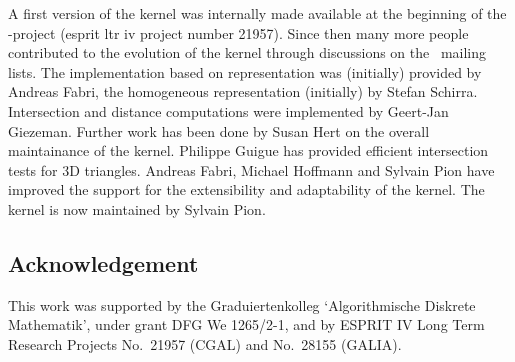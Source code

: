 A first version of the kernel was internally made available at the beginning
of the \cgal-project ({\sc esprit ltr iv} project number 21957).
Since then many more people contributed to the evolution of the kernel
through discussions on the \cgal\ mailing lists.
The implementation based on 
 representation was (initially) provided 
by Andreas Fabri, the homogeneous representation (initially) by Stefan Schirra.
Intersection and distance computations were implemented by Geert-Jan Giezeman.
Further work has been done by Susan Hert on the overall maintainance of the
kernel.
Philippe Guigue has provided efficient intersection tests for 3D triangles.
Andreas Fabri, Michael Hoffmann and Sylvain Pion have improved the support for
the extensibility and adaptability of the kernel.
The kernel is now maintained by Sylvain Pion.

\subsection*{Acknowledgement}

This work was supported
by the Graduiertenkolleg `Algorithmische Diskrete Mathematik',
under grant DFG We 1265/2-1,
and by ESPRIT IV Long Term Research Projects No.~21957 (CGAL)
and No.~28155 (GALIA).

